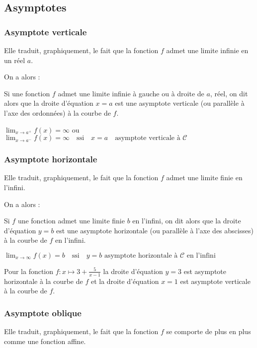 \subsection{Asymptotes}
\subsubsection{Asymptote verticale}
Elle traduit, graphiquement, le fait que la fonction $f$ admet une limite infinie en un réel $a$.

On a alors :

\begin{definition}
Si  une fonction $f$ admet une limite infinie à gauche ou à droite de $a$, réel, on dit alors que la droite d'équation $x=a$ est une asymptote verticale (ou parallèle à l'axe des ordonnées)  à la courbe de $f$.

$\displaystyle\lim_{x \to a^{+}}f(x)=\infty$  ou 
$\displaystyle\lim_{x \to a^{-}}f(x)=\infty\quad \text{ssi}\quad x=a \quad\text{asymptote verticale à }\mathcal{C} $
\end{definition}



\subsubsection{Asymptote horizontale}
Elle traduit, graphiquement, le fait que la fonction $f$ admet une limite finie en l'infini.

On a alors :

\begin{definition}
Si $f$ une fonction admet une limite finie $b$ en l'infini, on dit alors que la droite d'équation $y=b$ est une asymptote horizontale (ou parallèle à l'axe des abscisses) à la courbe de $f$ en l'infini.

$\displaystyle \lim_{x \to \infty}f(x)=b \quad\textrm{ssi}\quad y=b \text{ asymptote horizontale à }\mathcal{C} \text{ en l'infini}$
\end{definition}

\begin{example}
Pour la fonction $f : x\mapsto 3+ \frac{5}{x-1} $ 
la droite d'équation   $y = 3 $ est asymptote horizontale à la courbe de $f$
et la droite d'équation $x = 1$ est asymptote verticale à la courbe de $f.$

\end{example}
\subsubsection{Asymptote oblique}
Elle traduit, graphiquement, le fait que la fonction $f$ se comporte de plus en plus comme une fonction affine.

